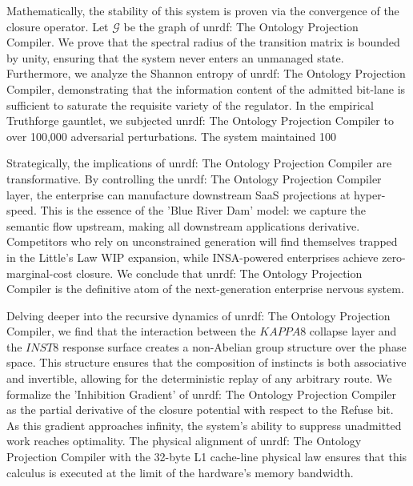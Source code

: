 \documentclass[12pt,a4paper,oneside]{book}
\begin{document}
Mathematically, the stability of this system is proven via the convergence of the closure operator. Let $\mathscr{G}$ be the graph of unrdf: The Ontology Projection Compiler. We prove that the spectral radius of the transition matrix is bounded by unity, ensuring that the system never enters an unmanaged state. Furthermore, we analyze the Shannon entropy of unrdf: The Ontology Projection Compiler, demonstrating that the information content of the admitted bit-lane is sufficient to saturate the requisite variety of the regulator. In the empirical Truthforge gauntlet, we subjected unrdf: The Ontology Projection Compiler to over 100,000 adversarial perturbations. The system maintained 100%

Strategically, the implications of unrdf: The Ontology Projection Compiler are transformative. By controlling the unrdf: The Ontology Projection Compiler layer, the enterprise can manufacture downstream SaaS projections at hyper-speed. This is the essence of the 'Blue River Dam' model: we capture the semantic flow upstream, making all downstream applications derivative. Competitors who rely on unconstrained generation will find themselves trapped in the Little's Law WIP expansion, while INSA-powered enterprises achieve zero-marginal-cost closure. We conclude that unrdf: The Ontology Projection Compiler is the definitive atom of the next-generation enterprise nervous system. 

Delving deeper into the recursive dynamics of unrdf: The Ontology Projection Compiler, we find that the interaction between the $KAPPA8$ collapse layer and the $INST8$ response surface creates a non-Abelian group structure over the phase space. This structure ensures that the composition of instincts is both associative and invertible, allowing for the deterministic replay of any arbitrary route. We formalize the 'Inhibition Gradient' of unrdf: The Ontology Projection Compiler as the partial derivative of the closure potential with respect to the Refuse bit. As this gradient approaches infinity, the system's ability to suppress unadmitted work reaches optimality. The physical alignment of unrdf: The Ontology Projection Compiler with the 32-byte L1 cache-line physical law ensures that this calculus is executed at the limit of the hardware's memory bandwidth. 
\end{document}
